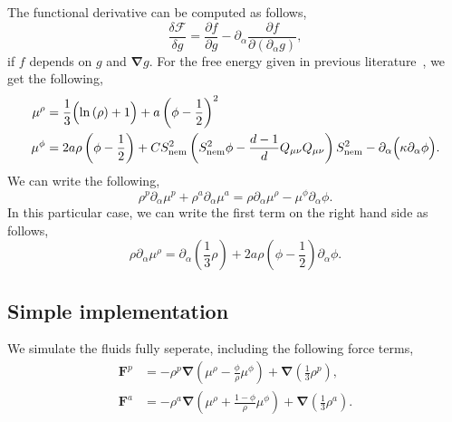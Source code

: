 \documentclass[fleqn,a4paper]{article} %
\numberwithin{equation}{section} %
\numberwithin{figure}{section} %
\numberwithin{algorithm}{section} %
\begin{document}
The functional derivative can be computed as follows,
\begin{equation}
    \frac{\delta \mathcal{F}}{\delta g} = \frac{\partial f}{\partial g} - \partial_\alpha \frac{\partial f}{\partial\left(\partial_\alpha g\right)},
\end{equation}
if $f$ depends on $g$ and $\bm{\nabla}g$. For the free energy given in previous literature~\cite{bhattacharyya_phase_2023}, we get the following,
\begin{equation}
\begin{split}
    \mu^\rho &= \frac{1}{3}\Bigl(\ln \left(\rho\right) + 1\Bigr) + a \left(\phi - \frac12\right)^2\\
    \mu^\phi &= 2 a \rho \left(\phi - \frac12\right) + C S_\text{nem}^2\left(S_\text{nem}^2 \phi - \frac{d-1}{d} Q_{\mu\nu}Q_{\mu\nu} \right)S_\text{nem}^2 - \partial_\alpha\Bigl(\kappa \partial_\alpha \phi\Bigr).
\end{split}
\end{equation}
We can write the following,
\begin{equation}
    \rho^p\partial_\alpha \mu^p + \rho^a\partial_\alpha \mu^a = \rho \partial_\alpha \mu^\rho - \mu^\phi \partial_\alpha \phi.
\end{equation}
In this particular case, we can write the first term on the right hand side as follows,
\begin{equation}
    \rho \partial_\alpha \mu^\rho = \partial_\alpha \left(\frac13 \rho\right) + 2 a \rho \left(\phi - \frac12\right) \partial_\alpha \phi. 
\end{equation}
\subsection{Simple implementation}
We simulate the fluids fully seperate, including the following force terms,
\begin{equation}
\begin{split}
    \bm{F}^p &= -\rho^p \bm{\nabla} \left(\mu^\rho - \frac{\phi}{\rho}\mu^\phi\right) + \bm{\nabla} \left(\frac13 \rho^p\right),\\
    \bm{F}^a &= -\rho^a \bm{\nabla} \left(\mu^\rho + \frac{1 - \phi}{\rho}\mu^\phi\right) + \bm{\nabla} \left(\frac13 \rho^a\right).
\end{split}
\end{equation}
\end{document}
